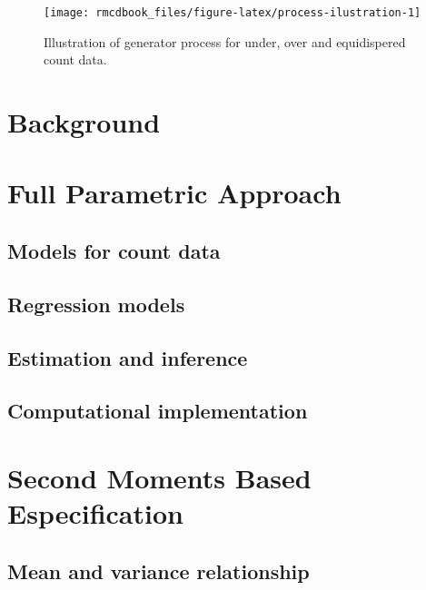 \documentclass[9pt,a5paper,]{book}
\begin{document}
\begin{figure}[h]

{\centering \texttt{[image: rmcdbook\_files/figure-latex/process-ilustration-1]} 

}

\caption{Illustration of generator process for under, over and equidispered count data.}\label{fig:process-ilustration}
\end{figure}

\chapter{Background}\label{background}

\chapter{Full Parametric Approach}\label{full-parametric-approach}

\section{Models for count data}\label{models-for-count-data}

\section{Regression models}\label{regression-models}

\section{Estimation and inference}\label{estimation-and-inference}

\section{Computational
implementation}\label{computational-implementation}

\chapter{Second Moments Based
Especification}\label{second-moments-based-especification}

\section{Mean and variance
relationship}\label{mean-and-variance-relationship}
\end{document}
